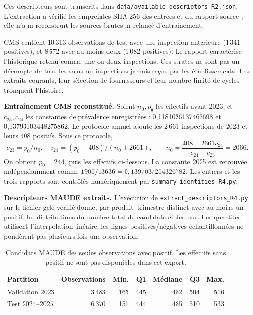 \documentclass[10pt,a4paper]{article}
\newcommand{\src}[1]{{\small\nolinkurl{#1}}}
\begin{document}
Ces descripteurs sont transcrits dans \src{data/available_descriptors_R2.json}. L'extraction a vérifié les empreintes SHA-256 des entrées et du rapport source ; elle n'a ni reconstruit les sources brutes ni relancé d'entraînement.

CMS contient 10\,313 observations de test avec une inspection antérieure (1\,341 positives), et 8\,672 avec au moins deux (1\,082 positives). Le rapport caractérise l'historique retenu comme une ou deux inspections. Ces strates ne sont pas un décompte de tous les soins ou inspections jamais reçus par les établissements. Les extraits courants, leur sélection de fournisseurs et leur nombre limité de cycles tronquent l'histoire\cite{hgbanalysis,hgbresults}.

\textbf{Entraînement CMS reconstitué.} Soient $n_0,p_0$ les effectifs avant 2023, et $c_{23},c_{24}$ les constantes de prévalence enregistrées : 0,1181026137463698 et 0,13793103448275862. Le protocole annuel ajoute les 2\,661 inspections de 2023 et leurs 408 positifs\cite{hgbcode}. Sous ce protocole,
\[
 c_{23}=p_0/n_0,\quad c_{24}=(p_0+408)/(n_0+2661),\qquad
 n_0=\frac{408-2661c_{24}}{c_{24}-c_{23}}=2066.
\]
On obtient $p_0=244$, puis les effectifs ci-dessous. La constante 2025 est retrouvée indépendamment comme $1905/13636=0,1397037254326782$. Les entiers et les trois rapports sont contrôlés numériquement par \src{summary_identities_R4.py}.
\begin{table}[!htbp]\centering\small
\caption{Effectifs CMS reconstruits algébriquement sous le protocole déclaré, non lus directement dans les lignes d'entraînement.}

\end{table}

\par{}
\textbf{Descripteurs MAUDE extraits.} L'exécution de \src{extract_descriptors_R4.py} sur le fichier gelé vérifié donne, par produit--trimestre distinct avec au moins un positif, les distributions du nombre total de candidats ci-dessous. Les quantiles utilisent l'interpolation linéaire; les lignes positives/négatives échantillonnées ne pondèrent pas plusieurs fois une observation.

\begin{table}[!htbp]\centering\small
\caption{Candidats MAUDE des seules observations avec positif. Les effectifs sans positif ne sont pas disponibles dans cet export.}
\begin{tabular}{@{}lrrrrrr@{}}\toprule
Partition & Observations & Min. & Q1 & Médiane & Q3 & Max.\\\midrule
Validation 2023 & 3\,483 & 165 & 445 & 482 & 504 & 516\\
Test 2024--2025 & 6\,370 & 151 & 444 & 485 & 510 & 533\\\bottomrule
\end{tabular}
\end{table}
\end{document}
